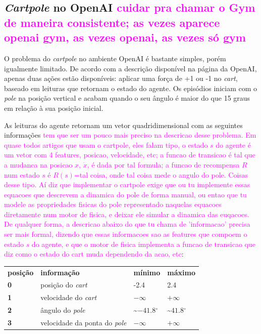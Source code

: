\documentclass[cic,tc]{iiufrgs}
\newcommand\bruno[1]{\textcolor{magenta}{#1}}
\begin{document}
\subsection{\textit{Cartpole} no OpenAI \bruno{cuidar pra chamar o Gym de maneira consistente; as vezes aparece openai gym, as vezes openai, as vezes só gym}}
O problema do \textit{cartpole} no ambiente OpenAI é bastante simples, porém igualmente limitado. De acordo com a descrição
disponível na página da OpenAI, apenas duas ações estão disponíveis: aplicar uma força de +1 ou -1 no \textit{cart}, baseado
em leituras que retornam o estado do agente. Os episódios iniciam com o \textit{pole} na posição vertical e acabam quando
o seu ângulo é maior do que 15 graus em relação à sua posição inicial. \par
As leituras do agente retornam um vetor quadridimensional com as seguintes informações \bruno{tem que ser um pouco mais preciso na descricao desse problema. Em quase todos artigos que usam o cartpole, eles falam tipo, o estado $s$ do agente é um vetor com 4 features, posicao, velocidade, etc; a funcao de transicao é tal que a mudanca na posicao $x$, $\dot{x}$, é dada por tal formula; a funcao de recompensa $R$ num estado $s$ é $R(s)$=tal coisa, onde tal coisa mede o angulo do pole. Coisas desse tipo. Aí diz que implementar o cartpole exige que ou tu implemente essas equacoes que descrevem a dinamica do pole de forma manual, ou entao que tu modele as propriedades fisicas do pole representado naquelas equacoes diretamente num motor de fisica, e deixar ele simular a dinamica das euqacoes. De qualquer forma, a descricao abaixo do que tu chama de 'informacao' precisa ser mais formal, dizendo que essas informacoes sao as features que compoem o estado $s$ do agente, e que o motor de fisica implementa a funcao de transicao que diz como o estado do cart muda dependendo da acao, etc}: \\
\begin{center}
  \begin{tabular}{llll}
  \textbf{posição} & \textbf{informação} & \textbf{mínimo} & \textbf{máximo} \\
  \textbf{0} & posição do \textit{cart} & -2.4 & 2.4 \\
  \textbf{1} & velocidade do \textit{cart} & $-\infty$ & $+\infty$ \\
  \textbf{2} & ângulo do \textit{pole} & \textasciitilde$-41.8{^\circ}$ & \textasciitilde$41.8{^\circ}$ \\
  \textbf{3} & velocidade da ponta do \textit{pole} &  $-\infty$ & $+\infty$ \\
  \end{tabular}
\end{center}
\end{document}
